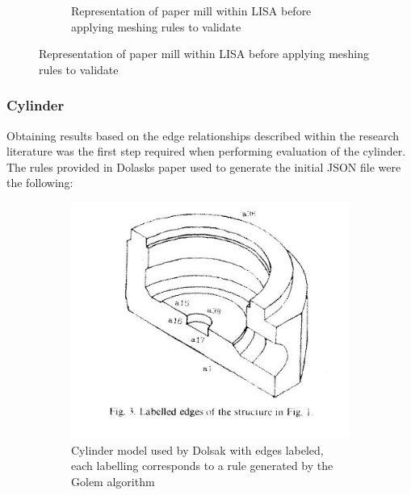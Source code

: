 \begin{figure}[!h]
\begin{subfigure}{.5\textwidth}
  \caption{Representation of paper mill within LISA before applying meshing rules to validate}
  \label{fig:sub2}
\end{subfigure}
\label{fig:test}
\end{figure}




\subsubsection{Cylinder}
Obtaining results based on the edge relationships described within the research literature was the first step required when performing evaluation of the cylinder. The rules provided in Dolasks paper used to generate the initial JSON file were the following:




\begin{figure}
\centering
\begin{subfigure}{.5\textwidth}
  \centering
  \includegraphics[width=0.9\linewidth]{../Graphics/DolsakCylinderWithEdges.jpeg}
  \caption{Cylinder model used by Dolsak with edges labeled, each labelling corresponds to a rule generated by the Golem algorithm \cite{DolsakPaper91}}
  \label{fig:sub1}
\end{subfigure}%
\begin{subfigure}{.5\textwidth}
  \centering

\end{subfigure}
\end{figure}
